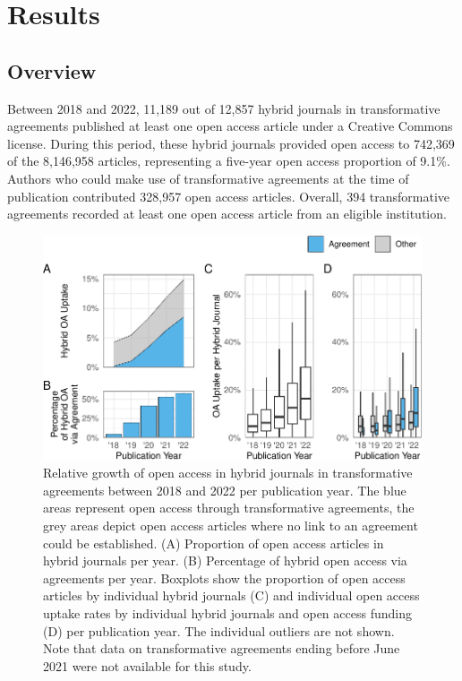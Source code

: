\documentclass[a4paper,man,floatsintext,longtable,noextraspace,12pt]{apa6}
\begin{document}
\hypertarget{results}{%
\section{Results}\label{results}}

\hypertarget{overview}{%
\subsection{Overview}\label{overview}}

Between 2018 and 2022, 11,189 out of 12,857 hybrid journals in
transformative agreements published at least one open access article
under a Creative Commons license. During this period, these hybrid
journals provided open access to 742,369 of the 8,146,958 articles,
representing a five-year open access proportion of 9.1\%. Authors who
could make use of transformative agreements at the time of publication
contributed 328,957 open access articles. Overall, 394 transformative
agreements recorded at least one open access article from an eligible
institution.

\begin{figure}[ht!]

{\centering \includegraphics[width=0.99\linewidth,]{fig/results_overview-1} 

}

\caption{Relative growth of open access in hybrid journals in transformative agreements between 2018 and 2022 per publication year. The blue areas represent open access through transformative agreements, the grey areas depict open access articles where no link to an agreement could be established. (A) Proportion of open access articles in hybrid journals per year. (B) Percentage of hybrid open access via agreements per year. Boxplots show the proportion of open access articles by individual hybrid journals (C) and individual open access uptake rates by individual hybrid journals and open access funding (D) per publication year. The individual outliers are not shown. Note that data on transformative agreements ending before June 2021 were not available for this study.}\label{fig:results_overview}
\end{figure}
\end{document}
